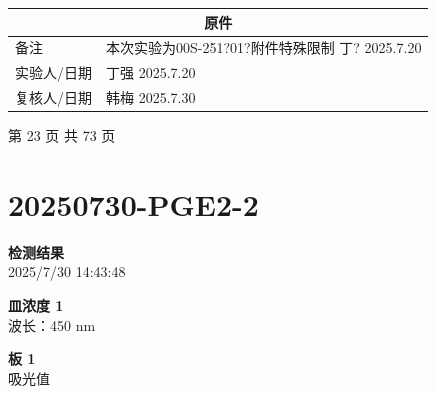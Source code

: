 \documentclass[UTF8,10pt,a4paper,fontset=fandol]{ctexart}
\newcommand{\fieldvalue}[1]{#1}
\newcommand{\handwritten}[1]{#1}
\begin{document}
\begin{center}
\begin{center}
\begin{center}
\setlength{\arrayrulewidth}{0.5pt}
\begin{tabularx}{0.86\textwidth}{|p{}|X|}
\hline
\multicolumn{2}{|c|}{原件} \\
\hline
备注 &
\fieldvalue{\handwritten{本次实验为00S-251?01?附件特殊限制}} \quad
\fieldvalue{\handwritten{丁? 2025.7.20}} \\
\hline
实验人/日期 &
\fieldvalue{\handwritten{丁强 2025.7.20}} \\
\hline
复核人/日期 &
\fieldvalue{\handwritten{韩梅 2025.7.30}} \\
\hline
\end{tabularx}
\end{center}

\vfill

\begin{center}
第 23 页 共 73 页
\end{center}

\newpage

\section*{20250730-PGE2-2}

\textbf{检测结果}\\
2025/7/30 14:43:48

\textbf{皿浓度 1}\\
波长：450 nm

\textbf{板 1}\\
吸光值


\end{center}
\end{center}
\end{document}

